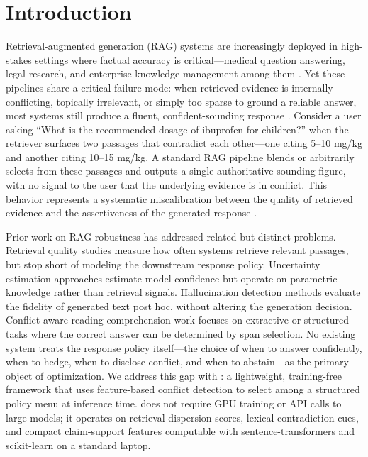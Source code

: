 \section{Introduction}

Retrieval-augmented generation (RAG) systems \citep{lewis2020rag} are increasingly deployed in high-stakes settings where factual accuracy is critical---medical question answering, legal research, and enterprise knowledge management among them \citep{nakano2021webgpt,gao2023enabling}. Yet these pipelines share a critical failure mode: when retrieved evidence is internally conflicting, topically irrelevant, or simply too sparse to ground a reliable answer, most systems still produce a fluent, confident-sounding response \citep{zhang2023siren,bang2023multitask}. Consider a user asking ``What is the recommended dosage of ibuprofen for children?'' when the retriever surfaces two passages that contradict each other---one citing 5--10 mg/kg and another citing 10--15 mg/kg. A standard RAG pipeline blends or arbitrarily selects from these passages and outputs a single authoritative-sounding figure, with no signal to the user that the underlying evidence is in conflict. This behavior represents a systematic miscalibration between the quality of retrieved evidence and the assertiveness of the generated response \citep{guo2017calibration,maynez2020faithfulness}.

Prior work on RAG robustness has addressed related but distinct problems. Retrieval quality studies \citep{retrievalrobust2024,nomiracl2024} measure how often systems retrieve relevant passages, but stop short of modeling the downstream response policy. Uncertainty estimation approaches \citep{kuhn2023semantic,kadavath2022language} estimate model confidence but operate on parametric knowledge rather than retrieval signals. Hallucination detection methods \citep{factscore2023,minicheck2024,li2023halueval} evaluate the fidelity of generated text post hoc, without altering the generation decision. Conflict-aware reading comprehension work \citep{chen2022rich,conflictqa2023,xie2023adaptive} focuses on extractive or structured tasks where the correct answer can be determined by span selection. No existing system treats the response policy itself---the choice of when to answer confidently, when to hedge, when to disclose conflict, and when to abstain---as the primary object of optimization. We address this gap with \textbf{\method{}}: a lightweight, training-free framework that uses feature-based conflict detection to select among a structured policy menu at inference time. \method{} does not require GPU training or API calls to large models; it operates on retrieval dispersion scores, lexical contradiction cues, and compact claim-support features computable with sentence-transformers and scikit-learn on a standard laptop.

